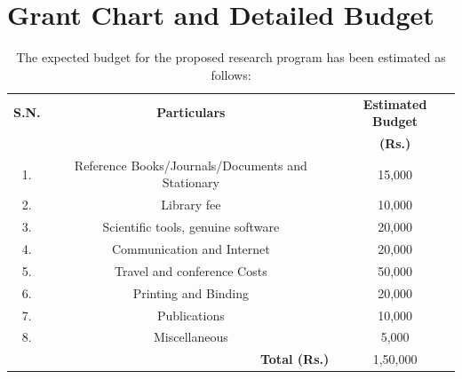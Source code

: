 \documentclass[fleqn,a4paper,12pt,oneside]{article}
\begin{document}
\section{Grant Chart and Detailed Budget}
\begin{table}[H]
	\centering
	\caption{The expected budget for the proposed research program has been estimated as follows:}
	\vspace{1 pt}
	\begin{tabular}{||c|c|c||}
		\hline
		\hline
		\textbf{S.N.} & \textbf{Particulars} & \textbf{Estimated Budget}\\
		 &  & \textbf{(Rs.)}\\
			\hline
		\hline
	1.	&	Reference Books/Journals/Documents and Stationary &	15,000\\
		\hline
		2.	&	Library fee 	& 10,000 \\
		\hline
	3.	&	Scientific tools, genuine software 	& 20,000 \\
		\hline
	4.	&        Communication and Internet	& 20,000\\
		\hline
		5.      &	Travel  and conference Costs 	& 50,000 \\
		\hline
			6.      &	Printing and Binding 	& 20,000 \\
				\hline
				7.      &	Publications 	& 10,000 \\
			\hline
			8.      &	Miscellaneous 	& 5,000 \\
			\hline
			\multicolumn{2}{||r|}{\textbf {Total (Rs.)}}        &  1,50,000\\
			\hline
			\hline
	\end{tabular}
	\label{Engpb}
\end{table}
\end{document}
